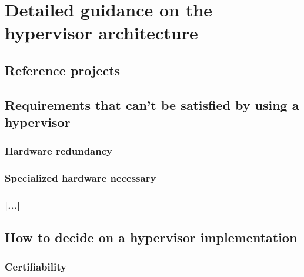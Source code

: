 
\chapter{Detailed guidance on the hypervisor architecture} %

\label{Chapter4} %


\newcommand{\keyword}[1]{\textbf{#1}}
\newcommand{\tabhead}[1]{\textbf{#1}}
\newcommand{\code}[1]{\texttt{#1}}
\newcommand{\file}[1]{\texttt{\bfseries#1}}
\newcommand{\option}[1]{\texttt{\itshape#1}}


\section{Reference projects}


\section{Requirements that can't be satisfied by using a hypervisor}
\subsection{Hardware redundancy}
\subsection{Specialized hardware necessary}
\subsection{[...]}


\section{How to decide on a hypervisor implementation}
\subsection{Certifiability}

